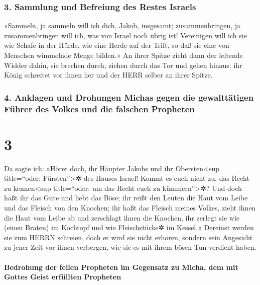 \hypertarget{sammlung-und-befreiung-des-restes-israels}{%
\subsubsection{3. Sammlung und Befreiung des Restes
Israels}\label{sammlung-und-befreiung-des-restes-israels}}

 »Sammeln, ja sammeln will ich dich, Jakob, insgesamt;
zusammenbringen, ja zusammenbringen will ich, was von Israel noch übrig
ist! Vereinigen will ich sie wie Schafe in der Hürde, wie eine Herde auf
der Trift, so daß sie eine von Menschen wimmelnde Menge bilden.«
 An ihrer Spitze zieht dann der leitende Widder dahin,
sie brechen durch, ziehen durch das Tor und gehen hinaus: ihr König
schreitet vor ihnen her und der HERR selber an ihrer Spitze.

\hypertarget{anklagen-und-drohungen-michas-gegen-die-gewalttuxe4tigen-fuxfchrer-des-volkes-und-die-falschen-propheten}{%
\subsubsection{4. Anklagen und Drohungen Michas gegen die gewalttätigen
Führer des Volkes und die falschen
Propheten}\label{anklagen-und-drohungen-michas-gegen-die-gewalttuxe4tigen-fuxfchrer-des-volkes-und-die-falschen-propheten}}

\hypertarget{section-2}{%
\section{3}\label{section-2}}

 Da sagte ich: »Höret doch, ihr Häupter Jakobs und ihr
Obersten\textless sup title=``oder: Fürsten''\textgreater✲ des Hauses
Israel! Kommt es euch nicht zu, das Recht zu kennen\textless sup
title=``oder: um das Recht euch zu kümmern''\textgreater✲?
 Und doch haßt ihr das Gute und liebt das Böse; ihr reißt
den Leuten die Haut vom Leibe und das Fleisch von den Knochen;
 ihr haßt das Fleisch meines Volkes, zieht ihnen die Haut
vom Leibe ab und zerschlagt ihnen die Knochen, ihr zerlegt sie wie
(einen Braten) im Kochtopf und wie Fleischstücke✲ im Kessel.«
 Dereinst werden sie zum HERRN schreien, doch er wird sie
nicht erhören, sondern sein Angesicht zu jener Zeit vor ihnen verbergen,
wie sie es mit ihrem bösen Tun verdient haben.

\hypertarget{bedrohung-der-feilen-propheten-im-gegensatz-zu-micha-dem-mit-gottes-geist-erfuxfcllten-propheten}{%
\paragraph{Bedrohung der feilen Propheten im Gegensatz zu Micha, dem mit
Gottes Geist erfüllten
Propheten}\label{bedrohung-der-feilen-propheten-im-gegensatz-zu-micha-dem-mit-gottes-geist-erfuxfcllten-propheten}}

